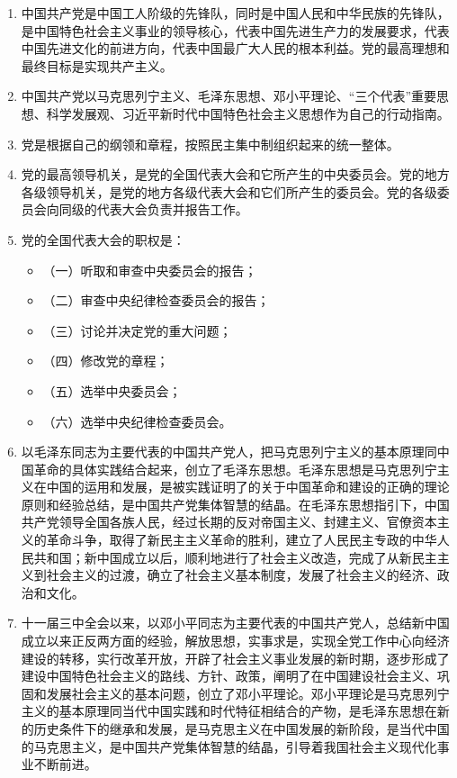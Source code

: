 \documentclass[UTF8,11pt,a4paper]{ctexart}
\begin{document}
\begin{enumerate}[label=\arabic*., leftmargin=2.3em]
\item 中国共产党是中国工人阶级的先锋队，同时是中国人民和中华民族的先锋队，是中国特色社会主义事业的领导核心，代表中国先进生产力的发展要求，代表中国先进文化的前进方向，代表中国最广大人民的根本利益。党的最高理想和最终目标是实现共产主义。
\item 中国共产党以马克思列宁主义、毛泽东思想、邓小平理论、“三个代表”重要思想、科学发展观、习近平新时代中国特色社会主义思想作为自己的行动指南。
\item 党是根据自己的纲领和章程，按照民主集中制组织起来的统一整体。
\item 党的最高领导机关，是党的全国代表大会和它所产生的中央委员会。党的地方各级领导机关，是党的地方各级代表大会和它们所产生的委员会。党的各级委员会向同级的代表大会负责并报告工作。
\item 党的全国代表大会的职权是：
\begin{itemize}[leftmargin=2.2em,label={}]
\item （一）听取和审查中央委员会的报告；
\item （二）审查中央纪律检查委员会的报告；
\item （三）讨论并决定党的重大问题；
\item （四）修改党的章程；
\item （五）选举中央委员会；
\item （六）选举中央纪律检查委员会。
\end{itemize}
\item 以毛泽东同志为主要代表的中国共产党人，把马克思列宁主义的基本原理同中国革命的具体实践结合起来，创立了毛泽东思想。毛泽东思想是马克思列宁主义在中国的运用和发展，是被实践证明了的关于中国革命和建设的正确的理论原则和经验总结，是中国共产党集体智慧的结晶。在毛泽东思想指引下，中国共产党领导全国各族人民，经过长期的反对帝国主义、封建主义、官僚资本主义的革命斗争，取得了新民主主义革命的胜利，建立了人民民主专政的中华人民共和国；新中国成立以后，顺利地进行了社会主义改造，完成了从新民主主义到社会主义的过渡，确立了社会主义基本制度，发展了社会主义的经济、政治和文化。
\item 十一届三中全会以来，以邓小平同志为主要代表的中国共产党人，总结新中国成立以来正反两方面的经验，解放思想，实事求是，实现全党工作中心向经济建设的转移，实行改革开放，开辟了社会主义事业发展的新时期，逐步形成了建设中国特色社会主义的路线、方针、政策，阐明了在中国建设社会主义、巩固和发展社会主义的基本问题，创立了邓小平理论。邓小平理论是马克思列宁主义的基本原理同当代中国实践和时代特征相结合的产物，是毛泽东思想在新的历史条件下的继承和发展，是马克思主义在中国发展的新阶段，是当代中国的马克思主义，是中国共产党集体智慧的结晶，引导着我国社会主义现代化事业不断前进。

\end{enumerate}
\end{document}
